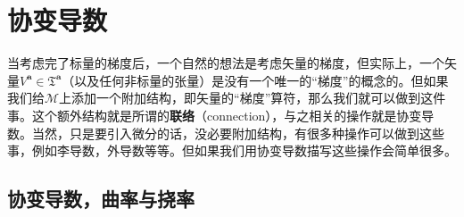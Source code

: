 \section{协变导数}

当考虑完了标量的梯度后，一个自然的想法是考虑矢量的梯度，但实际上，一个矢量$V^{\boldsymbol{a}} \in \mathfrak{T}^{\boldsymbol{a}}$（以及任何非标量的张量）是没有一个唯一的“梯度”的概念的。但如果我们给$\mathcal{M}$上添加一个附加结构，即矢量的“梯度”算符，那么我们就可以做到这件事。这个额外结构就是所谓的\textbf{联络}（connection），与之相关的操作就是协变导数。当然，只是要引入微分的话，没必要附加结构，有很多种操作可以做到这些事，例如李导数，外导数等等。但如果我们用协变导数描写这些操作会简单很多。


\subsection{协变导数，曲率与挠率}

